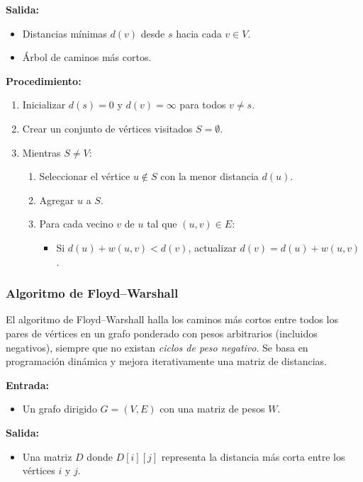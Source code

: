         \textbf{Salida:}
        \begin{itemize}
            \item Distancias mínimas $d(v)$ desde $s$ hacia cada $v \in V$.
            \item Árbol de caminos más cortos.
        \end{itemize}

        \textbf{Procedimiento:}
        \begin{enumerate}
            \item Inicializar $d(s) = 0$ y $d(v) = \infty$ para todos $v \neq s$.
            \item Crear un conjunto de vértices visitados $S = \emptyset$.
            \item Mientras $S \neq V$:
            \begin{enumerate}
                \item Seleccionar el vértice $u \notin S$ con la menor distancia $d(u)$.
                \item Agregar $u$ a $S$.
                \item Para cada vecino $v$ de $u$ tal que $(u,v) \in E$:
                \begin{itemize}
                    \item Si $d(u) + w(u,v) < d(v)$, actualizar $d(v) = d(u) + w(u,v)$.
                \end{itemize}
            \end{enumerate}
        \end{enumerate}

        \subsubsection{Algoritmo de Floyd–Warshall}

        El algoritmo de Floyd–Warshall halla los caminos más cortos entre todos los pares de vértices en un grafo ponderado con pesos arbitrarios (incluidos negativos), siempre que no existan \emph{ciclos de peso negativo}. Se basa en programación dinámica y mejora iterativamente una matriz de distancias.

        \textbf{Entrada:}
        \begin{itemize}
            \item Un grafo dirigido $G = (V, E)$ con una matriz de pesos $W$.
        \end{itemize}

        \textbf{Salida:}
        \begin{itemize}
            \item Una matriz $D$ donde $D[i][j]$ representa la distancia más corta entre los vértices $i$ y $j$.
        \end{itemize}

